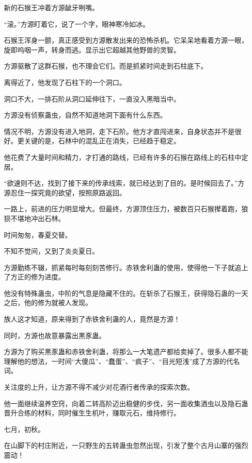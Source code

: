 \begin{this_body}
新的石猴王冲着方源龇牙咧嘴。

“滚。”方源盯着它，说了一个字，眼神寒冷如冰。

石猴王浑身一颤，真正感受到方源散发出来的恐怖杀机。它呆呆地看着方源一眼，旋即呜咽一声，转身而逃。显示出它超越其他野兽的灵智。

方源驱散了这群石猴，也不理会它们。而是抓紧时间走到石柱底下。

离得近了，他发现了石柱下的一个洞口。

洞口不大，一排石阶从洞口延伸往下，一直没入黑暗当中。

方源没有侦察蛊虫，自然不知道地洞下面有什么东西。

情况不明，方源没有进入地洞，走下石阶。他方才直闯进来，自身状态并不是很好。更关键的是，石林中的混乱正在消失，已经趋于稳定。

他花费了大量时间和精力，才打通的路线，已经有许多的石猴在路线上的石柱中定居。

“欲速则不达，找到了接下来的传承线索，就已经达到了目的。是时候回去了。”方源忍住一探究竟的欲望，按照原路返回。

一路上，前进的压力明显增大。但最终，方源顶住压力，被数百只石猴撵着跑，狼狈不堪地冲出石林。

时间匆匆，春夏交替。

不知不觉间，又到了炎炎夏日。

方源勤练不辍，抓紧每时每刻刻苦修行。赤铁舍利蛊的使用，使得他一下子就追上了方正的修为进度。

他没有特殊蛊虫，中阶的气息是隐藏不住的。在斩杀了石猴王，获得隐石蛊的一天之后，他的修为就被人发现。

族人这才知道，原来得到了赤铁舍利蛊的人，竟然是方源！

同时，方源也故意暴露出黒豕蛊。

方源为了购买黒豕蛊和赤铁舍利蛊，将那么一大笔遗产都给卖掉了。很多人都不能理解他的想法，一时间“大傻瓜”、“蠢蛋”、“疯子”、“目光短浅”成了方源的代名词。

关注度的上升，让方源不得不减少对花酒行者传承的探索次数。

他一面继续温养空窍，向着二转高阶迈出稳健的步伐，另一面收集酒虫以及隐石蛊晋升合练的材料，同时催生生机叶，赚取元石，维持修行。

七月，初秋。

在山脚下的村庄附近，一只野生的五转蛊虫忽然出现，引发了整个古月山寨的强烈震动！

\end{this_body}

